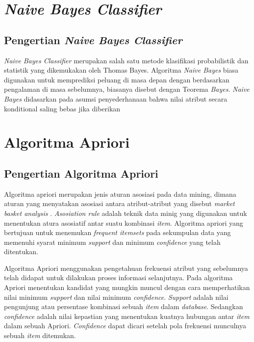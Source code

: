 \section{\textit{Naive Bayes Classifier}}
\subsection{Pengertian \textit{Naive Bayes Classifier}}
\textit{Naive Bayes Classifier} merupakan salah satu metode klasifikasi probabilistik dan statistik yang dikemukakan oleh Thomas Bayes. Algoritma \textit{Naive Bayes} biasa digunakan untuk memprediksi peluang di masa depan dengan berdasarkan pengalaman di masa sebelumnya, biasanya disebut dengan Teorema \textit{Bayes}. 
\textit{Naive Bayes} didasarkan pada asumsi penyederhanaan bahwa nilai atribut secara konditional saling bebas jika diberikan 

























\section{Algoritma Apriori}
\subsection{Pengertian Algoritma Apriori}
Algoritma apriori merupakan jenis aturan asosiasi pada data mining, dimana aturan yang menyatakan asosiasi antara atribut-atribut yang disebut \textit{market basket analysis} \cite{ye2006parallel}. \textit{Asosiation rule} adalah teknik data minig yang digunakan untuk menentukan atura asosiatif antar suatu kombinasi \textit{item}. Algoritma apriori yang bertujuan untuk menemukan \textit{frequent itemsets} pada sekumpulan data yang memenuhi syarat minimum \textit{support} dan minimum \textit{confidence} yang telah ditentukan.
\par
Algoritma Apriori menggunakan pengetahuan frekuensi atribut yang  sebelumnya telah didapat untuk dilakukan proses informasi selanjutnya. Pada algoritma Apriori  menentukan kandidat yang mungkin muncul dengan cara memperhatikan nilai minimum \textit{support} dan nilai minimum \textit{confidence}. \textit{Support} adalah nilai pengunjung atau persentase kombinasi sebuah \textit{item} dalam \textit{database}. Sedangkan \textit{confidence} adalah nilai kepastian yang menentukan kuatnya hubungan antar \textit{item} dalam sebuah Apriori. \textit{Confidence} dapat dicari setelah pola frekuensi munculnya sebuah \textit{item} ditemukan.


